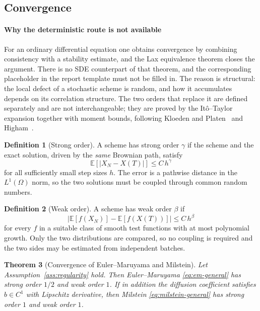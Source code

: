 \documentclass[11pt,a4paper]{article}
\newtheorem{theorem}{Theorem}[section]
\theoremstyle{definition}
\newtheorem{definition}[theorem]{Definition}
\theoremstyle{remark}
\begin{document}
\subsection{Convergence}
\label{sec:convergence}

\paragraph{Why the deterministic route is not available}
For an ordinary differential equation one obtains convergence by combining consistency with a stability estimate, and the Lax equivalence theorem closes the argument. There is no SDE counterpart of that theorem, and the corresponding placeholder in the report template must not be filled in. The reason is structural: the local defect of a stochastic scheme is random, and how it accumulates depends on its correlation structure. The two orders that replace it are defined separately and are not interchangeable; they are proved by the It\^o--Taylor expansion together with moment bounds, following Kloeden and Platen~\cite{kloeden} and Higham~\cite{higham}.

\begin{definition}[Strong order]
\label{def:strong}
A scheme has strong order $\gamma$ if the scheme and the exact solution, driven by the \emph{same} Brownian path, satisfy
\begin{equation}
    \mathbb{E}\!\left[ \left| X_N - X(T) \right| \right] \le C\, h^{\gamma}
    \label{eq:strong-order}
\end{equation}
for all sufficiently small step sizes $h$. The error is a pathwise distance in the $L^1(\Omega)$ norm, so the two solutions must be coupled through common random numbers.
\end{definition}

\begin{definition}[Weak order]
\label{def:weak}
A scheme has weak order $\beta$ if
\begin{equation}
    \left| \mathbb{E}\!\left[ f(X_N) \right] - \mathbb{E}\!\left[ f(X(T)) \right] \right| \le C\, h^{\beta}
    \label{eq:weak-order}
\end{equation}
for every $f$ in a suitable class of smooth test functions with at most polynomial growth. Only the two distributions are compared, so no coupling is required and the two sides may be estimated from independent batches.
\end{definition}

\begin{theorem}[Convergence of Euler--Maruyama and Milstein]
\label{thm:convergence}
Let Assumption~\ref{ass:regularity} hold. Then Euler--Maruyama \eqref{eq:em-general} has strong order $1/2$ and weak order $1$. If in addition the diffusion coefficient satisfies $b \in C^1$ with Lipschitz derivative, then Milstein \eqref{eq:milstein-general} has strong order $1$ and weak order $1$.
\end{theorem}
\end{document}
